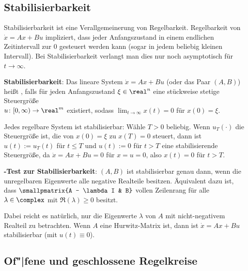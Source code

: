 \pagebreak

\subsection{%
    Stabilisierbarkeit%
}

Stabilisierbarkeit ist eine Verallgemeinerung von Regelbarkeit.
Regelbarkeit von $\dot{x} = Ax + Bu$ impliziert, dass jeder Anfangszustand
in einem endlichen Zeitintervall zur $0$ gesteuert werden kann
(sogar in jedem beliebig kleinen Intervall).
Bei Stabilisierbarkeit verlangt man dies nur noch asymptotisch für $t \to \infty$.

\textbf{Stabilisierbarkeit}:
Das lineare System $\dot{x} = Ax + Bu$ (oder das Paar $(A, B)$) heißt
, falls
für jeden Anfangszustand $\xi \in \real^n$ eine stückweise stetige Steuergröße\\
$u\colon [0, \infty) \rightarrow \real^m$ existiert, sodass $\lim_{t \to \infty} x(t) = 0$
für $x(0) = \xi$.

Jedes regelbare System ist stabilisierbar:
Wähle $T > 0$ beliebig.
Wenn $u_T(\cdot)$ die Steuergröße ist, die von $x(0) = \xi$ zu $x(T) = 0$ steuert,
dann ist $u(t) := u_T(t)$ für $t \le T$ und $u(t) := 0$ für $t > T$ eine
stabilisierende Steuergröße, da $\dot{x} = Ax + Bu = 0$ für $x = u = 0$,
also $x(t) = 0$ für $t > T$.

\linie

\textbf{-Test zur Stabilisierbarkeit}:
$(A, B)$ ist stabilisierbar genau dann, wenn
die unregelbaren Eigenwerte alle negative Realteile besitzen.
Äquivalent dazu ist, dass $\smallpmatrix{A - \lambda I & B}$ vollen Zeilenrang für alle
$\lambda \in \complex$ mit $\Re(\lambda) \ge 0$ besitzt.

Dabei reicht es natürlich, nur die Eigenwerte $\lambda$ von $A$ mit nicht-negativem Realteil
zu betrachten.
Wenn $A$ eine Hurwitz-Matrix ist, dann ist $\dot{x} = Ax + Bu$ stabilisierbar
(mit $u(t) \equiv 0$).

\subsection{%
    Of"|fene und geschlossene Regelkreise%
}

